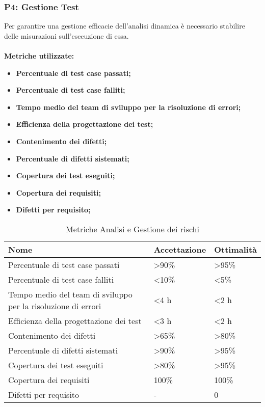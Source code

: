 \subsubsection{P4: Gestione Test}
Per garantire una gestione efficacie dell'analisi dinamica è necessario stabilire delle misurazioni sull'esecuzione di essa.\\\\
\textbf{Metriche utilizzate:}
\begin{itemize}
    \item \textbf{Percentuale di test case passati;}
    \item \textbf{Percentuale di test case falliti;}
    \item \textbf{Tempo medio del team di sviluppo per la risoluzione di errori;} 
    \item \textbf{Efficienza della progettazione dei test;}
    \item \textbf{Contenimento dei difetti;}
    \item \textbf{Percentuale di difetti sistemati;}
    \item \textbf{Copertura dei test eseguiti;}
    \item \textbf{Copertura dei requisiti;}
    \item \textbf{Difetti per requisito;}
\end{itemize}
\begin{table}[!htbp]
	\centering
	\renewcommand{\arraystretch}{2} 
		\begin{tabular}{|l|l|l|}
			\rowcolor{orange!50}
			\hline
			Nome & Accettazione & Ottimalità \\
			\hline 
			Percentuale di test case passati        & >90\%     & >95\%   \\
			\hline
	    	Percentuale di test case falliti        & <10\%     & <5\%   \\
			\hline
			Tempo medio del team di sviluppo per la risoluzione di errori
			& <4 h      & <2 h   \\
			\hline
			Efficienza della progettazione dei test & <3 h      & <2 h  \\
			\hline
	    	Contenimento dei difetti                & >65\%     & >80\%  \\
			\hline
			Percentuale di difetti sistemati        & >90\%     & >95\%  \\
			\hline
			Copertura dei test eseguiti             & >80\%     & >95\%  \\
			\hline
			Copertura dei requisiti                 & 100\%     & 100\%  \\
			\hline
			Difetti per requisito                   & -         & 0   \\
			\hline
		\end{tabular}
	\caption{Metriche Analisi e Gestione dei rischi}
\end{table}
\clearpage
